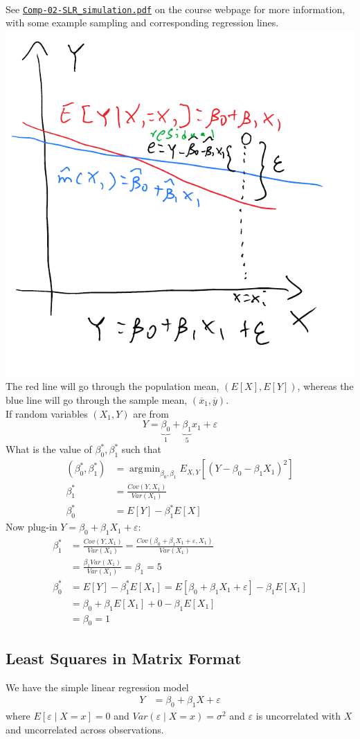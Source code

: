 \documentclass[12 pt]{article}
\DeclareMathOperator*{\argmin}{arg\!\min}
\begin{document}
\\ See \href{http://www.math.mcgill.ca/yyang/regression/comp/Comp-02-SLR_simulation.pdf}{\texttt{Comp-02-SLR\_simulation.pdf}} on the course webpage for more
information, with some example sampling and corresponding regression
lines.
\\
\includegraphics[width=.6\textwidth]{10.pdf}
\\ The red line will go through the population mean, $(E[X], E[Y])$,
whereas the blue line will go through the sample mean, $(\overline{x}_1,
\overline{y})$.
\\If random variables $(X_1, Y)$ are from
$$Y = \underbrace{\beta_0}_{1} + \underbrace{\beta_1}_5 x_1 +
\varepsilon$$
What is the value of $\beta_0^*, \beta_1^*$ such that
\begin{align*}
(\beta_0^*, \beta_1^*) & = \argmin_{\beta_0, \beta_1} E_{X,Y} [(Y -
\beta_0 - \beta_1 X_1)^2]
 \\ \beta_1^* & = \frac{Cov(Y,X_1)}{Var(X_1)}
  \\ \beta_0^* & = E[Y] - \beta_1^* E[X]
\end{align*}
Now plug-in $Y = \beta_0 + \beta_1 X_1 + \varepsilon$:
\begin{align*}
  \beta_1^* & = \frac{Cov(Y, X_1)}{Var(X_1)} = \frac{Cov(\beta_0 + \beta_1 X_1 + \varepsilon, X_1)}{Var(X_1)}
  \\ & = \frac{\beta_1 Var(X_1)}{Var(X_1)} = \beta_1 = 5
  \\ \beta_0^* & = E[Y] - \beta_1^* E[X_1] = E[\beta_0 + \beta_1X_1 + \varepsilon] - \beta_1 E[X_1]
  \\ & = \beta_0 + \beta_1 E[X_1] + 0 - \beta_1 E[X_1]
  \\ & = \beta_0 = 1
\end{align*}
\subsection{Least Squares in Matrix Format}
We have the simple linear regression model
\begin{align*}
  Y & = \beta_0 + \beta_1 X + \varepsilon
\end{align*}
where $E[\varepsilon \mid X = x] = 0$ and $Var(\varepsilon \mid X = x)
= \sigma^2$ and $\varepsilon$ is uncorrelated with $X$ and
uncorrelated across observations.
\end{document}
